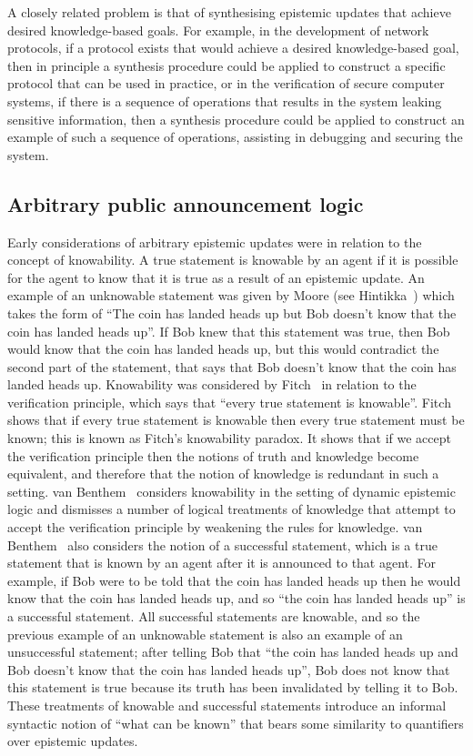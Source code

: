 A closely related problem is that of synthesising epistemic updates that achieve desired knowledge-based goals.
For example, in the development of network protocols, if a protocol exists that would achieve a desired knowledge-based goal, then in principle a synthesis procedure could be applied to construct a specific protocol that can be used in practice, or in the verification of secure computer systems, if there is a sequence of operations that results in the system leaking sensitive information, then a synthesis procedure could be applied to construct an example of such a sequence of operations, assisting in debugging and securing the system.

\subsection{Arbitrary public announcement logic}

Early considerations of arbitrary epistemic updates were in relation to the concept of knowability.
A true statement is knowable by an agent if it is possible for the agent to know that it is true as a result of an epistemic update.
An example of an unknowable statement was given by Moore (see Hintikka~\cite{hintikka:1962}) which takes the form of ``The coin has landed heads up but Bob doesn't know that the coin has landed heads up''.
If Bob knew that this statement was true, then Bob would know that the coin has landed heads up, but this would contradict the second part of the statement, that says that Bob doesn't know that the coin has landed heads up.
Knowability was considered by Fitch~\cite{fitch:1963} in relation to the verification principle, which says that ``every true statement is knowable''.
Fitch shows that if every true statement is knowable then every true statement must be known; this is known as Fitch's knowability paradox.
It shows that if we accept the verification principle then the notions of truth and knowledge become equivalent, and therefore that the notion of knowledge is redundant in such a setting.
van Benthem~\cite{vanbenthem:2004} considers knowability in the setting of dynamic epistemic logic and dismisses a number of logical treatments of knowledge that attempt to accept the verification principle by weakening the rules for knowledge.
van Benthem~\cite{vanbenthem:2004} also considers the notion of a successful statement, which is a true statement that is known by an agent after it is announced to that agent.
For example, if Bob were to be told that the coin has landed heads up then he would know that the coin has landed heads up, and so ``the coin has landed heads up'' is a successful statement.
All successful statements are knowable, and so the previous example of an unknowable statement is also an example of an unsuccessful statement; after telling Bob that ``the coin has landed heads up and Bob doesn't know that the coin has landed heads up'', Bob does not know that this statement is true because its truth has been invalidated by telling it to Bob.
These treatments of knowable and successful statements introduce an informal syntactic notion of ``what can be known'' that bears some similarity to quantifiers over epistemic updates.


